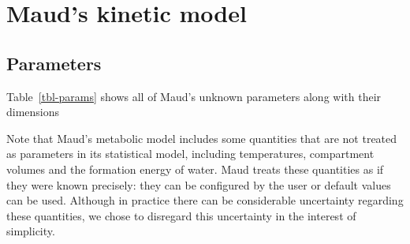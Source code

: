 \documentclass[journal=asbcd6,manuscript=article,layout=traditional]{achemso}
\begin{document}
\section{Maud's kinetic model}\label{mauds-kinetic-model}

\subsection{Parameters}\label{parameters}

Table~\ref{tbl-params} shows all of Maud's unknown parameters along with
their dimensions

Note that Maud's metabolic model includes some quantities that are not
treated as parameters in its statistical model, including temperatures,
compartment volumes and the formation energy of water. Maud treats these
quantities as if they were known precisely: they can be configured by
the user or default values can be used. Although in practice there can
be considerable uncertainty regarding these quantities, we chose to
disregard this uncertainty in the interest of simplicity.
\end{document}
